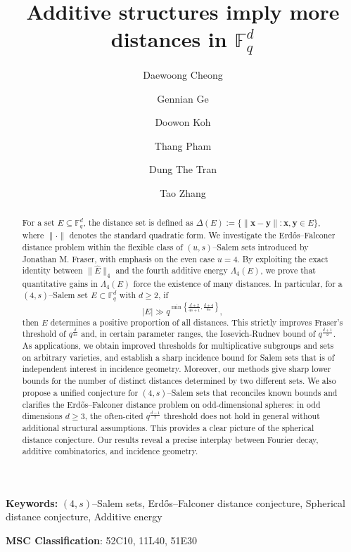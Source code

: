 \documentclass[11pt]{article}
\begin{document}
\title{Additive structures imply more distances in $\mathbb{F}_q^d$}
\author{Daewoong Cheong\and Gennian Ge\and Doowon Koh\and Thang Pham\and Dung The Tran\and Tao Zhang}
\date{}
\maketitle
\begin{abstract}
For a set $E \subseteq \mathbb{F}_q^d$, the distance set is defined as $\Delta(E) := \{\|\mathbf{x} - \mathbf{y}\| : \mathbf{x}, \mathbf{y} \in E\}$, where $\|\cdot\|$ denotes the standard quadratic form. We investigate the Erd\H{o}s--Falconer distance problem within the flexible class of $(u, s)$--Salem sets introduced by Jonathan M. Fraser, with emphasis on the even case $u = 4$. By exploiting the exact identity between $\|\widehat{E}\|_4$ and the fourth additive energy $\Lambda_4(E)$, we prove that quantitative gains in $\Lambda_4(E)$ force the existence of many distances. In particular, for a $(4, s)$--Salem set $E\subset \mathbb{F}_q^d$ with $d \geq 2$, if
\[
|E|\gg  q^{\min\left\{\frac{d+2}{4s+1}, \frac{d+4}{8s}\right\}},
\]
then $E$ determines a positive proportion of all distances. This strictly improves Fraser's threshold of $q^{\frac{d}{4s}}$ and, in certain parameter ranges,  the Iosevich-Rudnev bound of $q^{\frac{d+1}{2}}$. As applications, we obtain improved thresholds for multiplicative subgroups and sets on arbitrary varieties, and establish a sharp incidence bound for Salem sets that is of independent interest in incidence geometry. Moreover, our methods give sharp lower bounds for the number of distinct distances determined by two different sets. We also propose a unified conjecture for $(4, s)$--Salem sets that reconciles known bounds and clarifies the Erd\H{o}s--Falconer distance problem on odd-dimensional spheres: in odd dimensions $d \geq 3$, the often-cited $q^{\frac{d-1}{2}}$ threshold does not hold in general without additional structural assumptions. This provides a clear picture of the spherical distance conjecture. Our results reveal a precise interplay between Fourier decay, additive combinatorics, and incidence geometry.
\end{abstract}

\textbf{Keywords:} $(4, s)$--Salem sets, Erd\H{o}s--Falconer distance conjecture, Spherical distance conjecture, Additive energy

\textbf{MSC Classification}: 52C10, 11L40, 51E30

\tableofcontents
\end{document}
